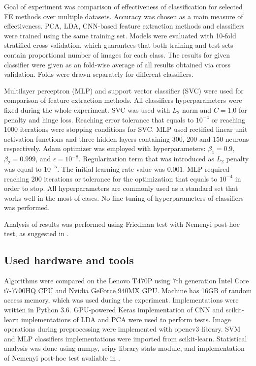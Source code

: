 \documentclass[a4paper, 10 pt, journal]{ieeeconf}
\begin{document}
Goal of experiment was comparison of effectiveness of classification for selected FE methods over multiple datasets. Accuracy was chosen as a main measure of effectiveness. PCA, LDA, CNN-based feature extraction methods and classifiers were trained using the same training set. Models were evaluated with 10-fold stratified cross validation, which guarantees that both training and test sets contain proportional number of images for each class. The results for given classifier were given as an fold-wise average of all results obtained via cross validation. Folds were drawn separately for different classifiers. 

Multilayer perceptron (MLP) and support vector classifier (SVC) were used for comparison of feature extraction methods. All classifiers hyperparameters were fixed during the whole experiment. SVC was used with $L_{2}$ norm and $C=1.0$ for penalty and hinge loss. Reaching error tolerance that equals to $10^{-4}$ or reaching 1000 iterations were stopping conditions for SVC. MLP used rectified linear unit activation functions and three hidden layers containing 300, 200 and 150 neurons respectively. Adam optimizer was employed with hyperparameters: $\beta_1 = 0.9$, $\beta_2 = 0.999$, and $\epsilon=10^{-8}$. Regularization term that was introduced as $L_2$ penalty was equal to $10^{-5}$. The initial learning rate value was $0.001$. MLP required reaching $200$ iterations or tolerance for the optimization that equals to $10^{-4}$ in order to stop.
All hyperparameters are commonly used as a standard set that works well in the most of cases. No fine-tuning of hyperparameters of classifiers was performed.

Analysis of results was performed using Friedman test with Nemenyi post-hoc test, as suggested in \cite{demsar}.

\subsection{Used hardware and tools}

Algorithms were compared on the Lenovo T470P using 7th generation Intel Core i7-7700HQ CPU and Nvidia GeForce 940MX GPU. Machine has 16GB of random access memory, which was used during the experiment. Implementations were written in Python 3.6. GPU-powered Keras implementation of CNN and scikit-learn implementations of LDA and PCA were used to perform tests. Image operations during preprocessing were implemented with opencv3 library. SVM and MLP classifiers implementations were imported from scikit-learn. Statistical analysis was done using numpy, scipy library stats module, and implementation of Nemenyi post-hoc test avaliable in \cite{post_hoc_nemenyi}.
\end{document}
